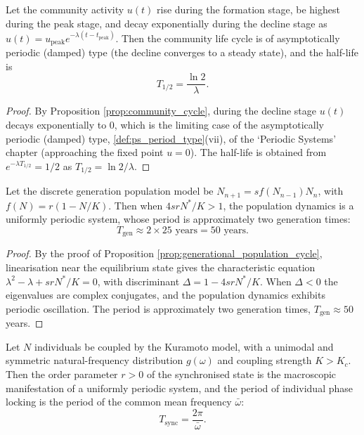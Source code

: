 \begin{lemma}\label{lem:community_periodic}
Let the community activity $u(t)$ rise during the formation stage, be highest during the peak stage, and decay exponentially during the decline stage as $u(t)=u_{\text{peak}}e^{-\lambda(t-t_{\text{peak}})}$. Then the community life cycle is of asymptotically periodic (damped) type (the decline converges to a steady state), and the half-life is
\[
T_{1/2}=\frac{\ln 2}{\lambda}.
\]
\end{lemma}

\begin{proof}
By Proposition \ref{prop:community_cycle}, during the decline stage $u(t)$ decays exponentially to $0$, which is the limiting case of the asymptotically periodic (damped) type, \cref{def:ps_period_type}(vii), of the `Periodic Systems' chapter (approaching the fixed point $u=0$). The half-life is obtained from $e^{-\lambda T_{1/2}}=1/2$ as $T_{1/2}=\ln2/\lambda$.
\end{proof}

\begin{lemma}\label{lem:generational_pop_periodic}
Let the discrete generation population model be $N_{n+1}=s f(N_{n-1})N_n$, with $f(N)=r(1-N/K)$. Then when $4srN^*/K>1$, the population dynamics is a uniformly periodic system, whose period is approximately two generation times:
\[
T_{\text{gen}}\approx 2\times 25\text{ years}=50\text{ years}.
\]
\end{lemma}

\begin{proof}
By the proof of Proposition \ref{prop:generational_population_cycle}, linearisation near the equilibrium state gives the characteristic equation $\lambda^2-\lambda+srN^*/K=0$, with discriminant $\Delta=1-4srN^*/K$. When $\Delta<0$ the eigenvalues are complex conjugates, and the population dynamics exhibits periodic oscillation. The period is approximately two generation times, $T_{\text{gen}}\approx50$ years.
\end{proof}

\begin{lemma}\label{lem:kuramoto_periodic}
Let $N$ individuals be coupled by the Kuramoto model, with a unimodal and symmetric natural-frequency distribution $g(\omega)$ and coupling strength $K>K_c$. Then the order parameter $r>0$ of the synchronised state is the macroscopic manifestation of a uniformly periodic system, and the period of individual phase locking is the period of the common mean frequency $\bar\omega$:
\[
T_{\text{sync}}=\frac{2\pi}{\bar\omega}.
\]
\end{lemma}

